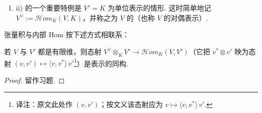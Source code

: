 \begin{numpara}
\begin{enumerate}[label=\roman*)]
\begin{remark*}
\end{remark*}
\item ii) 的一个重要特例是 $V' = K$ 为单位表示的情形. 这时简单地记 $V^{\vee} := \mathcal{H}om_K(V, K)$，并称之为 $V$ 的（也称 $V$ 的对偶表示）.
\end{enumerate}
张量积与内部 $\mathrm{Hom}$ 按下述方式相联系：
\begin{lemma*}
若 $V$ 与 $V'$ 都是有限维，则态射 $V^{\vee} \otimes_K V' \longrightarrow \mathcal{H}om_K(V, V')$（它把 $v^{*} \otimes v'$ 映为态射 $(v, v') \mapsto \langle v, v^{*}\rangle\, v'$\footnote{译注：原文此处作 $(v, v')$；按文义该态射应为 $v \mapsto \langle v, v^{*}\rangle\, v'$.}）是表示的同构.
\end{lemma*}
\begin{proof}
留作习题.
\end{proof}
\end{numpara}

